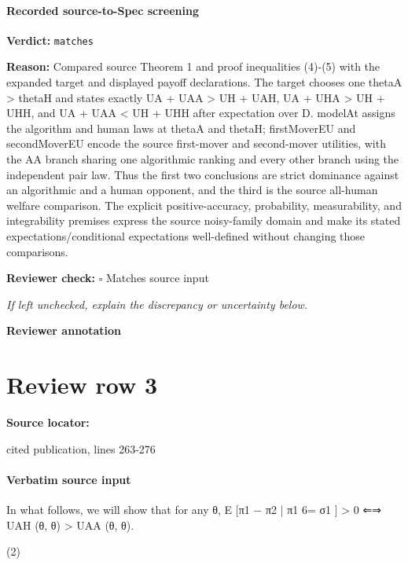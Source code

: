 \documentclass[10pt]{article}
\newcommand{\reviewerbox}{%
  \par\noindent\fbox{\parbox{0.96\linewidth}{\rule{0pt}{0.38in}}}\par
}
\newcommand{\reviewmatch}[1]{%
  \par\noindent\textbf{Reviewer check:} $\square$\; #1\par
  \noindent\emph{If left unchecked, explain the discrepancy or uncertainty below.}\par
}
\begin{document}
\paragraph{Recorded source-to-Spec screening}
\textbf{Verdict:} \texttt{matches}
\\
{\raggedright
\textbf{Reason:} Compared source Theorem 1 and proof inequalities (4)-\allowbreak{}(5) with the expanded target and displayed payoff declarations.\allowbreak{}  The target chooses one thetaA > thetaH and states exactly UA + UAA > UH + UAH, UA + UHA > UH + UHH, and UA + UAA < UH + UHH after expectation over D.\allowbreak{}  modelAt assigns the algorithm and human laws at thetaA and thetaH;\allowbreak{} firstMoverEU and secondMoverEU encode the source first-\allowbreak{}mover and second-\allowbreak{}mover utilities, with the AA branch sharing one algorithmic ranking and every other branch using the independent pair law.\allowbreak{}  Thus the first two conclusions are strict dominance against an algorithmic and a human opponent, and the third is the source all-\allowbreak{}human welfare comparison.\allowbreak{}  The explicit positive-\allowbreak{}accuracy, probability, measurability, and integrability premises express the source noisy-\allowbreak{}family domain and make its stated expectations/\allowbreak{}conditional expectations well-\allowbreak{}defined without changing those comparisons.\allowbreak{}
\par}
\reviewmatch{Matches source input}
\noindent\textbf{Reviewer annotation}\par
\reviewerbox
\clearpage
\hypertarget{source-claim-0a74bbe90425faa9}{}
\section*{Review row 3}
\textbf{Source locator:} {\footnotesize\raggedright cited publication, lines 263-\allowbreak{}276\par}
\paragraph{Verbatim source input}
\begin{ReviewVerbatim}
In what follows, we will show that for any θ,
E [π1 − π2 | π1 6= σ1 ] > 0 ⇐⇒ UAH (θ, θ) > UAA (θ, θ).

(2)
\end{ReviewVerbatim}
\end{document}
